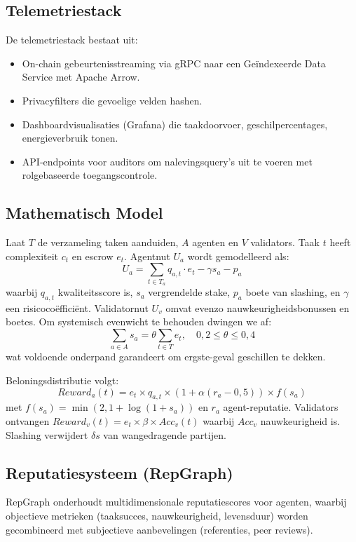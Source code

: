 \documentclass[11pt]{article}
\begin{document}
\subsection{Telemetriestack}
De telemetriestack bestaat uit:
\begin{itemize}[noitemsep]
  \item On-chain gebeurtenisstreaming via gRPC naar een Geïndexeerde Data Service met Apache Arrow.
  \item Privacyfilters die gevoelige velden hashen.
  \item Dashboardvisualisaties (Grafana) die taakdoorvoer, geschilpercentages, energieverbruik tonen.
  \item API-endpoints voor auditors om nalevingsquery's uit te voeren met rolgebaseerde toegangscontrole.
\end{itemize}

\subsection{Mathematisch Model}
Laat $T$ de verzameling taken aanduiden, $A$ agenten en $V$ validators. Taak $t$ heeft complexiteit $c_t$ en escrow $e_t$. Agentnut $U_a$ wordt gemodelleerd als:
\begin{equation}
U_a = \sum_{t \in T_a} q_{a,t}\cdot e_t - \gamma s_a - p_a\label{eq:agent-utility}
\end{equation}
waarbij $q_{a,t}$ kwaliteitsscore is, $s_a$ vergrendelde stake, $p_a$ boete van slashing, en $\gamma$ een risicocoëfficiënt. Validatornut $U_v$ omvat evenzo nauwkeurigheidsbonussen en boetes. Om systemisch evenwicht te behouden dwingen we af:
\begin{equation}
\sum_{a \in A} s_a = \theta \sum_{t \in T} e_t,\quad 0,2 \leq \theta \leq 0,4
\end{equation}
wat voldoende onderpand garandeert om ergste-geval geschillen te dekken.

Beloningsdistributie volgt:
\begin{equation}
Reward_a(t) = e_t \times q_{a,t} \times \left(1 + \alpha (r_a - 0,5)\right) \times f(s_a)
\end{equation}
met $f(s_a) = \min(2, 1 + \log(1+s_a))$ en $r_a$ agent-reputatie. Validators ontvangen $Reward_v(t) = e_t \times \beta \times Acc_v(t)$ waarbij $Acc_v$ nauwkeurigheid is. Slashing verwijdert $\delta s$ van wangedragende partijen.

\subsection{Reputatiesysteem (RepGraph)}
\label{sec:reputation}
RepGraph onderhoudt multidimensionale reputatiescores voor agenten, waarbij objectieve metrieken (taaksucces, nauwkeurigheid, levensduur) worden gecombineerd met subjectieve aanbevelingen (referenties, peer reviews).
\end{document}
